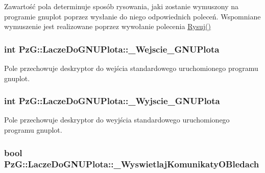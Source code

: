 Zawartość pola determinuje sposób rysowania, jaki zostanie wymuszony na programie {\ttfamily gnuplot} poprzez wysłanie do niego odpowiednich poleceń. Wspomniane wymuszenie jest realizowane poprzez wywołanie polecenia \hyperlink{class_pz_g_1_1_lacze_do_g_n_u_plota_a065f5b8402737cc62b0ad4f66d028335}{Rysuj()} \hypertarget{class_pz_g_1_1_lacze_do_g_n_u_plota_adc3a2250216c2473a61da379da70b2d7}{
\subsubsection[{\+\_\+\+Wejscie\+\_\+\+G\+N\+U\+Plota}]{\setlength{\rightskip}{0pt plus 5cm}int Pz\+G\+::\+Lacze\+Do\+G\+N\+U\+Plota\+::\+\_\+\+Wejscie\+\_\+\+G\+N\+U\+Plota\hspace{0.3cm}{\ttfamily [protected]}}}\label{class_pz_g_1_1_lacze_do_g_n_u_plota_adc3a2250216c2473a61da379da70b2d7}
Pole przechowuje deskryptor do wejścia standardowego uruchomionego programu gnuplot. \hypertarget{class_pz_g_1_1_lacze_do_g_n_u_plota_a7d05a4767a35ee494d59724bb740dbc2}{
\subsubsection[{\+\_\+\+Wyjscie\+\_\+\+G\+N\+U\+Plota}]{\setlength{\rightskip}{0pt plus 5cm}int Pz\+G\+::\+Lacze\+Do\+G\+N\+U\+Plota\+::\+\_\+\+Wyjscie\+\_\+\+G\+N\+U\+Plota\hspace{0.3cm}{\ttfamily [protected]}}}\label{class_pz_g_1_1_lacze_do_g_n_u_plota_a7d05a4767a35ee494d59724bb740dbc2}
Pole przechowuje deskryptor do weyjścia standardowego uruchomionego programu gnuplot. \hypertarget{class_pz_g_1_1_lacze_do_g_n_u_plota_a2f2800f14ebfe1caef0b4d30c410a7fe}{
\subsubsection[{\+\_\+\+Wyswietlaj\+Komunikaty\+O\+Bledach}]{\setlength{\rightskip}{0pt plus 5cm}bool Pz\+G\+::\+Lacze\+Do\+G\+N\+U\+Plota\+::\+\_\+\+Wyswietlaj\+Komunikaty\+O\+Bledach\hspace{0.3cm}{\ttfamily [protected]}}}\label{class_pz_g_1_1_lacze_do_g_n_u_plota_a2f2800f14ebfe1caef0b4d30c410a7fe}


